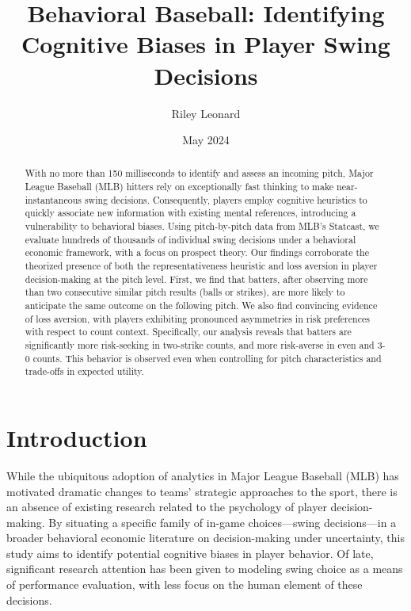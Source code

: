 \documentclass[12pt]{article}
\title{Behavioral Baseball: Identifying Cognitive Biases in Player Swing Decisions}
\author{Riley Leonard}
\affil{Cornell University}
\date{May 2024}
\numberwithin{equation}{section}
\begin{document}
\onehalfspacing


\maketitle


\begin{abstract}

With no more than 150 milliseconds to identify and assess an incoming pitch, Major League Baseball (MLB) hitters rely on exceptionally fast thinking to make near-instantaneous swing decisions. Consequently, players employ cognitive heuristics to quickly associate new information with existing mental references, introducing a vulnerability to behavioral biases. Using pitch-by-pitch data from MLB’s Statcast, we evaluate hundreds of thousands of individual swing decisions under a behavioral economic framework, with a focus on prospect theory. Our findings corroborate the theorized presence of both the representativeness heuristic and loss aversion in player decision-making at the pitch level.  First, we find that batters, after observing more than two consecutive similar pitch results (balls or strikes), are more likely to anticipate the same outcome on the following pitch. We also find convincing evidence of loss aversion, with players exhibiting pronounced asymmetries in risk preferences with respect to count context. Specifically, our analysis reveals that batters are significantly more risk-seeking in two-strike counts, and more risk-averse in even and 3-0 counts. This behavior is observed even when controlling for pitch characteristics and trade-offs in expected utility. 

\end{abstract}


\section{Introduction}

While the ubiquitous adoption of analytics in Major League Baseball (MLB) has motivated dramatic changes to teams’ strategic approaches to the sport, there is an absence of existing research related to the psychology of player decision-making. By situating a specific family of in-game choices---swing decisions---in a broader behavioral economic literature on decision-making under uncertainty, this study aims to identify potential cognitive biases in player behavior. Of late, significant research attention has been given to modeling swing choice as a means of performance evaluation, with less focus on the human element of these decisions.
\end{document}
